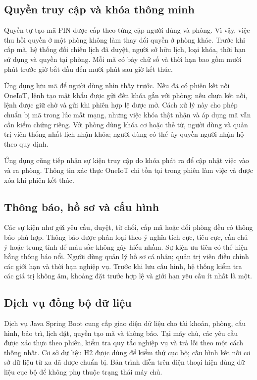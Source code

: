 \subsection{Quyền truy cập và khóa thông minh}

Quyền tự tạo mã PIN được cấp theo từng cặp người dùng và phòng. Vì vậy, việc thu hồi quyền ở một phòng không làm thay đổi quyền ở phòng khác. Trước khi cấp mã, hệ thống đối chiếu lịch đã duyệt, người sở hữu lịch, loại khóa, thời hạn sử dụng và quyền tại phòng. Mỗi mã có bảy chữ số và thời hạn bao gồm mười phút trước giờ bắt đầu đến mười phút sau giờ kết thúc.

Ứng dụng lưu mã để người dùng nhìn thấy trước. Nếu đã có phiên kết nối OneIoT, lệnh tạo mật khẩu được gửi đến khóa gắn với phòng; nếu chưa kết nối, lệnh được giữ chờ và gửi khi phiên hợp lệ được mở. Cách xử lý này cho phép chuẩn bị mã trong lúc mất mạng, nhưng việc khóa thật nhận và áp dụng mã vẫn cần kiểm chứng riêng. Với phòng dùng khóa cơ hoặc thẻ từ, người dùng và quản trị viên thống nhất lịch nhận khóa; người dùng có thể ủy quyền người nhận hộ theo quy định.

Ứng dụng cũng tiếp nhận sự kiện truy cập do khóa phát ra để cập nhật việc vào và ra phòng. Thông tin xác thực OneIoT chỉ tồn tại trong phiên làm việc và được xóa khi phiên kết thúc.

\subsection{Thông báo, hồ sơ và cấu hình}

Các sự kiện như gửi yêu cầu, duyệt, từ chối, cấp mã hoặc đổi phòng đều có thông báo phù hợp. Thông báo được phân loại theo ý nghĩa tích cực, tiêu cực, cần chú ý hoặc trung tính để màu sắc không gây hiểu nhầm. Sự kiện ưu tiên có thể hiện bằng thông báo nổi. Người dùng quản lý hồ sơ cá nhân; quản trị viên điều chỉnh các giới hạn và thời hạn nghiệp vụ. Trước khi lưu cấu hình, hệ thống kiểm tra các giá trị không âm, khoảng đặt trước hợp lệ và giới hạn yêu cầu ít nhất là một.

\subsection{Dịch vụ đồng bộ dữ liệu}

Dịch vụ Java Spring Boot cung cấp giao diện dữ liệu cho tài khoản, phòng, cấu hình, bảo trì, lịch đặt, quyền tạo mã và thông báo. Tại máy chủ, các yêu cầu được xác thực theo phiên, kiểm tra quy tắc nghiệp vụ và trả lỗi theo một cách thống nhất. Cơ sở dữ liệu H2 được dùng để kiểm thử cục bộ; cấu hình kết nối cơ sở dữ liệu từ xa đã được chuẩn bị. Bản trình diễn trên điện thoại hiện dùng dữ liệu cục bộ để không phụ thuộc trạng thái máy chủ.

